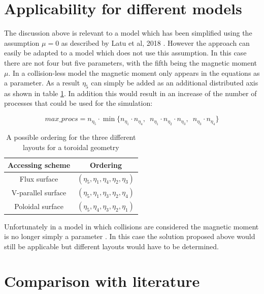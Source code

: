 \section{Applicability for different models}

The discussion above is relevant to a model which has been simplified using the assumption $\mu=0$ as described by Latu et al, 2018 \cite{YamanPaper}. However the approach can easily be adapted to a model which does not use this assumption. In this case there are not four but five parameters, with the fifth being the magnetic moment $\mu$. In a collision-less model the magnetic moment only appears in the equations as a parameter. As a result $\eta_5$ can simply be added as an additional distributed axis as shown in table \ref{tab::Toroidal Ordering}. In addition this would result in an increase of the number of processes that could be used for the simulation:

$$max\_procs = n_{\eta_5} \cdot \min\{n_{\eta_1}\!\!\cdot n_{\eta_4},\, \, \, n_{\eta_1}\!\!\cdot n_{\eta_2}\!\! \cdot n_{\eta_3},\, \, \, n_{\eta_3}\!\!\cdot n_{\eta_4}\}$$

\begin{table}[ht]
\begin{center}
 \begin{tabular}{|c|c|}
  \hline
  Accessing scheme & Ordering\\
  \hline
  Flux surface & $(\eta_5, \eta_1,\eta_4,\eta_2,\eta_3)$\\
  \hline
  V-parallel surface & $(\eta_5, \eta_1,\eta_3,\eta_2,\eta_4)$\\
  \hline
  Poloidal surface & $(\eta_5, \eta_4,\eta_3,\eta_2,\eta_1)$\\
  \hline
 \end{tabular}
 \caption{\label{tab::Toroidal Ordering} A possible ordering for the three different layouts for a toroidal geometry}
\end{center}
\end{table}

Unfortunately in a model in which collisions are considered the magnetic moment is no longer simply a parameter .
In this case the solution proposed above would still be applicable but different layouts would have to be determined.

\section{Comparison with literature}

